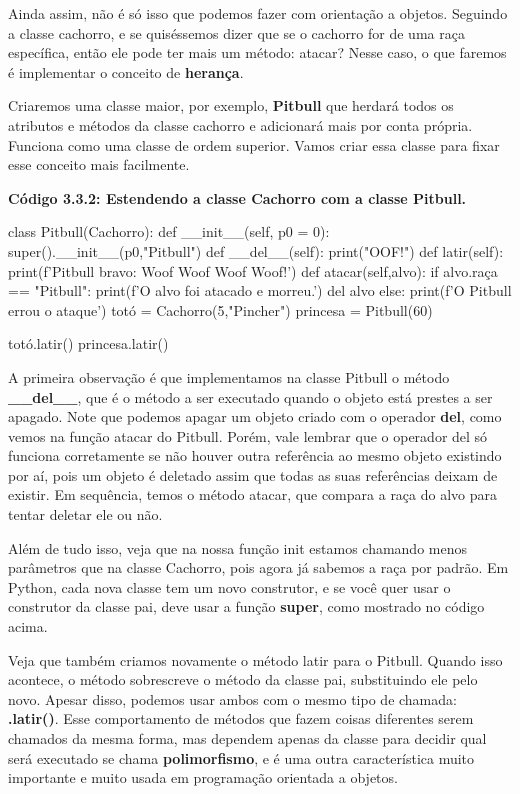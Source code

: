 \documentclass[11pt, a4paper]{article}
\begin{document}
Ainda assim, não é só isso que podemos fazer com orientação a objetos. Seguindo a classe cachorro, e se quiséssemos dizer que se o cachorro for de uma raça específica, então ele pode ter mais um método: atacar? Nesse caso, o que faremos é implementar o conceito de \textbf{herança}.

Criaremos uma classe maior, por exemplo, \textbf{Pitbull} que herdará todos os atributos e métodos da classe cachorro e adicionará mais por conta própria. Funciona como uma classe de ordem superior. Vamos criar essa classe para fixar esse conceito mais facilmente.

\textbf{Código 3.3.2: Estendendo a classe Cachorro com a classe Pitbull.}

\begin{code}
class Pitbull(Cachorro):
    def __init__(self, p0 = 0):
        super().__init__(p0,"Pitbull")
    def __del__(self):
        print("OOF!")
    def latir(self):
        print(f'Pitbull bravo: Woof Woof Woof Woof!')
    def atacar(self,alvo):
        if alvo.raça == "Pitbull":
            print(f'O alvo foi atacado e morreu.')
            del alvo
        else:
            print(f'O Pitbull errou o ataque')
totó = Cachorro(5,"Pincher")
princesa = Pitbull(60)

totó.latir()
princesa.latir()
\end{code}

A primeira observação é que implementamos na classe Pitbull o método \textbf{\_\_del\_\_}, que é o método a ser executado quando o objeto está prestes a ser apagado. Note que podemos apagar um objeto criado com o operador \textbf{del}, como vemos na função atacar do Pitbull. Porém, vale lembrar que o operador del só funciona corretamente se não houver outra referência ao mesmo objeto existindo por aí, pois um objeto é deletado assim que todas as suas referências deixam de existir. Em sequência, temos o método atacar, que compara a raça do alvo para tentar deletar ele ou não.

Além de tudo isso, veja que na nossa função init estamos chamando menos parâmetros que na classe Cachorro, pois agora já sabemos a raça por padrão. Em Python, cada nova classe tem um novo construtor, e se você quer usar o construtor da classe pai, deve usar a função \textbf{super}, como mostrado no código acima.

Veja que também criamos novamente o método latir para o Pitbull. Quando isso acontece, o método sobrescreve o método da classe pai, substituindo ele pelo novo. Apesar disso, podemos usar ambos com o mesmo tipo de chamada: \textbf{.latir()}. Esse comportamento de métodos que fazem coisas diferentes serem chamados da mesma forma, mas dependem apenas da classe para decidir qual será executado se chama \textbf{polimorfismo}, e é uma outra característica muito importante e muito usada em programação orientada a objetos.
\end{document}
